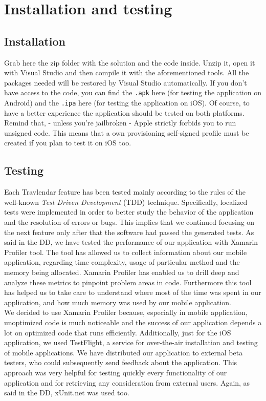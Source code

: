 \chapter{Installation and testing}
\label{cha:testing}

\section{Installation}
Grab here the zip folder with the solution and the code inside. Unzip it, open it with Visual Studio and then compile it with the aforementioned tools. All the packages needed will be restored by Visual Studio automatically. If you don't have access to the code, you can find the \verb|.apk| here (for testing the application on Android) and the \verb|.ipa| here (for testing the application on iOS). Of course, to have a better experience the application should be tested on both platforms. Remind that, - unless you're jailbroken - Apple strictly forbids you to run unsigned code. This means that a own provisioning self-signed profile must be created if you plan to test it on iOS too.

\section{Testing}
Each Travlendar feature has been tested mainly according to the rules of the well-known \textit{Test Driven Development} (TDD) technique. Specifically, localized tests were implemented in order to better study the behavior of the application and the resolution of errors or bugs. This implies that we continued focusing on the next feature only after that the software had passed the generated tests. As said in the DD, we have tested the performance of our application with Xamarin Profiler tool. The tool has allowed us to collect information about our mobile application, regarding time complexity, usage of particular method and the memory being allocated. Xamarin Profiler has enabled us to drill deep and analyze these metrics to pinpoint problem areas in code. Furthermore this tool has helped us to take care to understand where most of the time was spent in our application, and how much memory was used by our mobile application.\\

We decided to use Xamarin Profiler because, especially in mobile application, unoptimized code is much noticeable and the success of our application depends a lot on optimized code that runs efficiently. Additionally, just for the iOS application, we used TestFlight, a service for over-the-air installation and testing of mobile applications. We have distributed our application to external beta testers, who could subsequently send feedback about the application. This approach was very helpful for testing quickly every functionality of our application and for retrieving any consideration from external users. Again, as said in the DD, xUnit.net was used too.

